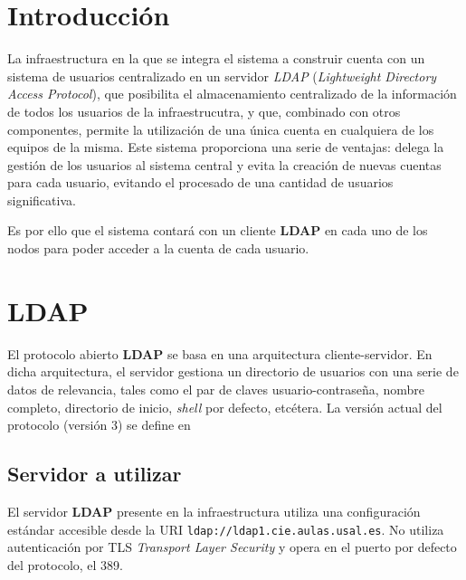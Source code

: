 \documentclass{article}
\title{\hmwkTitle}
\author{\textbf{\hmwkAuthorName}}
\date{21 de abril de 2015}
\begin{document}
\maketitle


\setcounter{tocdepth}{1}

\newpage
\tableofcontents
\newpage

\section{Introducción}

La infraestructura en la que se integra el sistema a construir cuenta con un sistema de usuarios centralizado en un servidor \textit{LDAP} (\textit{Lightweight Directory Access Protocol}), que posibilita el almacenamiento centralizado de la información de todos los usuarios de la infraestrucutra, y que, combinado con otros componentes, permite la utilización de una única cuenta en cualquiera de los equipos de la misma. Este sistema proporciona una serie de ventajas: delega la gestión de los usuarios al sistema central y evita la creación de nuevas cuentas para cada usuario, evitando el procesado de una cantidad de usuarios significativa.

Es por ello que el sistema contará con un cliente \textbf{LDAP} en cada uno de los nodos para poder acceder a la cuenta de cada usuario.

\section{LDAP}

El protocolo abierto \textbf{LDAP} se basa en una arquitectura cliente-servidor. En dicha arquitectura, el servidor gestiona un directorio de usuarios con una serie de datos de relevancia, tales como el par de claves usuario-contraseña, nombre completo, directorio de inicio, \textit{shell} por defecto, etcétera. La versión actual del protocolo (versión 3) se define en \cite{rfc4511} 

\subsection{Servidor a utilizar}

El servidor \textbf{LDAP} presente en la infraestructura utiliza una configuración estándar accesible desde la URI  \texttt{ldap://ldap1.cie.aulas.usal.es}. No utiliza autenticación por TLS \textit{Transport Layer Security} y opera en el puerto por defecto del protocolo, el 389.
\end{document}
